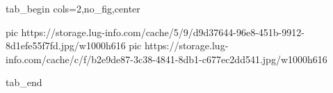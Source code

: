 
 
 
 
 

\ifcmt
  tab_begin cols=2,no_fig,center

     pic https://storage.lug-info.com/cache/5/9/d9d37644-96e8-451b-9912-8d1efe55f7fd.jpg/w1000h616
		 pic https://storage.lug-info.com/cache/c/f/b2e9de87-3c38-4841-8db1-c677ec2dd541.jpg/w1000h616

  tab_end
\fi
